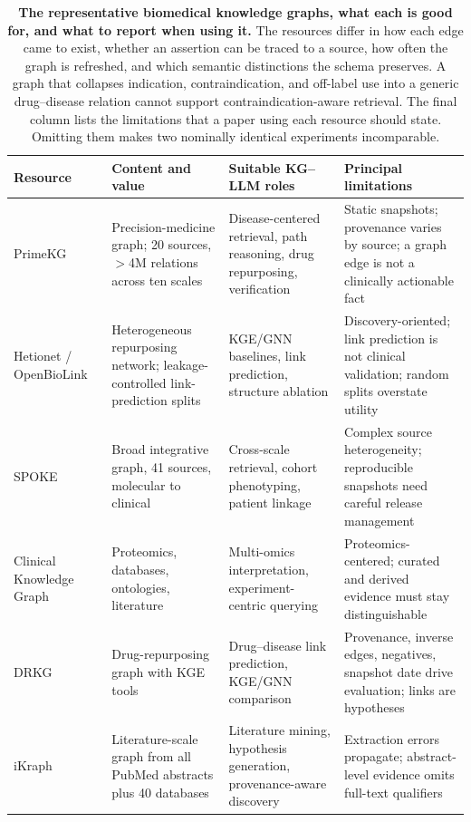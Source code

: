 

\begin{table}[!t]
\centering
\caption{\textbf{The representative biomedical knowledge graphs, what each is good for, and what to report when using it.} The resources differ in how each edge came to exist, whether an assertion can be traced to a source, how often the graph is refreshed, and which semantic distinctions the schema preserves. A graph that collapses indication, contraindication, and off-label use into a generic drug--disease relation cannot support contraindication-aware retrieval. The final column lists the limitations that a paper using each resource should state. Omitting them makes two nominally identical experiments incomparable.}
\label{tab:resources}
\footnotesize
\begin{tabularx}{\textwidth}{@{}L{2.6cm} Y Y Y@{}}
\toprule
\textbf{Resource} & \textbf{Content and value} & \textbf{Suitable KG--LLM roles} & \textbf{Principal limitations} \\
\midrule
PrimeKG~\cite{chandak2023primekg} & Precision-medicine graph; 20 sources, $>$4M relations across ten scales & Disease-centered retrieval, path reasoning, drug repurposing, verification & Static snapshots; provenance varies by source; a graph edge is not a clinically actionable fact \\
Hetionet / OpenBioLink~\cite{himmelstein2017hetionet,breit2020openbiolink} & Heterogeneous repurposing network; leakage-controlled link-prediction splits & KGE/GNN baselines, link prediction, structure ablation & Discovery-oriented; link prediction is not clinical validation; random splits overstate utility \\
SPOKE~\cite{morris2023spoke} & Broad integrative graph, 41 sources, molecular to clinical & Cross-scale retrieval, cohort phenotyping, patient linkage & Complex source heterogeneity; reproducible snapshots need careful release management \\
Clinical Knowledge Graph~\cite{santos2022ckg} & Proteomics, databases, ontologies, literature & Multi-omics interpretation, experiment-centric querying & Proteomics-centered; curated and derived evidence must stay distinguishable \\
DRKG~\cite{ioannidis2020drkg} & Drug-repurposing graph with KGE tools & Drug--disease link prediction, KGE/GNN comparison & Provenance, inverse edges, negatives, snapshot date drive evaluation; links are hypotheses \\
iKraph~\cite{zhang2025ikraph} & Literature-scale graph from all PubMed abstracts plus 40 databases & Literature mining, hypothesis generation, provenance-aware discovery & Extraction errors propagate; abstract-level evidence omits full-text qualifiers \\

\end{tabularx}
\end{table}
